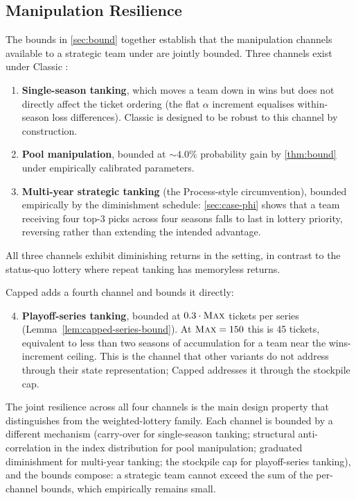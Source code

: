 \subsection{Manipulation Resilience}
\label{sec:resilience}

The bounds in \cref{sec:bound} together establish that the manipulation channels available to a strategic team under \cola{} are jointly bounded. Three channels exist under Classic \cola{}:
\begin{enumerate}
    \item \textbf{Single-season tanking}, which moves a team down in wins but does not directly affect the ticket ordering (the flat $\alpha$ increment equalises within-season loss differences). Classic \cola{} is designed to be robust to this channel by construction.
    \item \textbf{Pool manipulation}, bounded at ${\sim}4.0\%$ probability gain by \cref{thm:bound} under empirically calibrated parameters.
    \item \textbf{Multi-year strategic tanking} (the Process-style circumvention), bounded empirically by the diminishment schedule: \cref{sec:case-phi} shows that a team receiving four top-3 picks across four seasons falls to last in lottery priority, reversing rather than extending the intended advantage.
\end{enumerate}
All three channels exhibit diminishing returns in the \cola{} setting, in contrast to the status-quo lottery where repeat tanking has memoryless returns.

Capped \cola{} adds a fourth channel and bounds it directly:
\begin{enumerate}
    \setcounter{enumi}{3}
    \item \textbf{Playoff-series tanking}, bounded at $0.3 \cdot \textup{\textsc{Max}}$ tickets per series (Lemma~\ref{lem:capped-series-bound}). At $\textup{\textsc{Max}} = 150$ this is 45 tickets, equivalent to less than two seasons of accumulation for a team near the wins-increment ceiling. This is the channel that other \cola{} variants do not address through their state representation; Capped \cola{} addresses it through the stockpile cap.
\end{enumerate}
The joint resilience across all four channels is the main design property that distinguishes \cola{} from the weighted-lottery family. Each channel is bounded by a different mechanism (carry-over for single-season tanking; structural anti-correlation in the index distribution for pool manipulation; graduated diminishment for multi-year tanking; the stockpile cap for playoff-series tanking), and the bounds compose: a strategic team cannot exceed the sum of the per-channel bounds, which empirically remains small.

